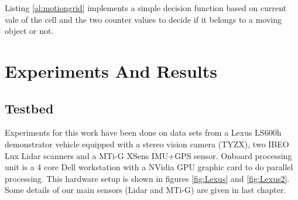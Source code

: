 Listing \ref{al:motiongrid} implements a simple decision function based on current vale of the cell and the two counter values to decide if it belongs to a moving object or not.

\section{Experiments And Results}






\subsection{Testbed}
\label{sec:testbed}

Experiments for this work have been done on data sets from a Lexus LS600h demonstrator vehicle equipped with a stereo vision camera (TYZX), two IBEO Lux Lidar scanners and a MTi-G XSens IMU+GPS sensor. Onboard processing unit is a 4 core Dell workstation with a NVidia GPU graphic card to do parallel processing. This hardware setup is shown in figures \ref{fig:Lexus} and \ref{fig:Lexus2}. Some details of our main sensors (Lidar and MTi-G) are given in last chapter.

